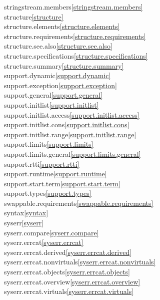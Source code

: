 \begin{multicols}{2}
stringstream.members\quad\ref{stringstream.members}\\
structure\quad\ref{structure}\\
structure.elements\quad\ref{structure.elements}\\
structure.requirements\quad\ref{structure.requirements}\\
structure.see.also\quad\ref{structure.see.also}\\
structure.specifications\quad\ref{structure.specifications}\\
structure.summary\quad\ref{structure.summary}\\
support.dynamic\quad\ref{support.dynamic}\\
support.exception\quad\ref{support.exception}\\
support.general\quad\ref{support.general}\\
support.initlist\quad\ref{support.initlist}\\
support.initlist.access\quad\ref{support.initlist.access}\\
support.initlist.cons\quad\ref{support.initlist.cons}\\
support.initlist.range\quad\ref{support.initlist.range}\\
support.limits\quad\ref{support.limits}\\
support.limits.general\quad\ref{support.limits.general}\\
support.rtti\quad\ref{support.rtti}\\
support.runtime\quad\ref{support.runtime}\\
support.start.term\quad\ref{support.start.term}\\
support.types\quad\ref{support.types}\\
swappable.requirements\quad\ref{swappable.requirements}\\
syntax\quad\ref{syntax}\\
syserr\quad\ref{syserr}\\
syserr.compare\quad\ref{syserr.compare}\\
syserr.errcat\quad\ref{syserr.errcat}\\
syserr.errcat.derived\quad\ref{syserr.errcat.derived}\\
syserr.errcat.nonvirtuals\quad\ref{syserr.errcat.nonvirtuals}\\
syserr.errcat.objects\quad\ref{syserr.errcat.objects}\\
syserr.errcat.overview\quad\ref{syserr.errcat.overview}\\
syserr.errcat.virtuals\quad\ref{syserr.errcat.virtuals}\\

\end{multicols}
